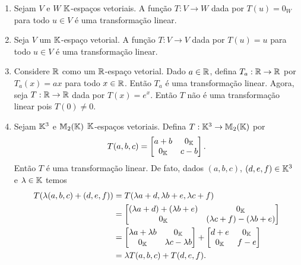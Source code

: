 \begin{exemplo}
	\begin{enumerate}
		\item Sejam $V$ e $W$ $\mathbb{K}$-espa\c{c}os vetoriais. A fun\c{c}\~ao $T : V \to W$ dada por $T(u) = 0_W$ para todo $u \in V$ \'e uma transforma\c{c}\~ao linear.
		
		\item Seja $V$ um $\mathbb{K}$-espa\c{c}o vetorial. A fun\c{c}\~ao $T : V \to V$ dada por $T(u) = u$ para todo $u \in V$ \'e uma transforma\c{c}\~ao linear.
		
		\item Considere $\mathbb{R}$ como um $\mathbb{R}$-espa\c{c}o vetorial. Dado $a \in \mathbb{R}$, defina $T_a : \mathbb{R} \to \mathbb{R}$ por $T_a(x) = ax$ para todo $x \in \mathbb{R}$. Ent\~ao $T_a$ \'e uma transforma\c{c}\~ao linear. Agora, seja $T : \mathbb{R} \to \mathbb{R}$ dada por $T(x) = e^x$. Ent\~ao $T$ n\~ao \'e uma transforma\c{c}\~ao linear pois $T(0) \ne 0$.
		
		\item Sejam $\mathbb{K}^3$ e $\mathbb{M}_2(\mathbb{K})$ $\mathbb{K}$-espa\c{c}os vetoriais. Defina $T : \mathbb{K}^3 \to \mathbb{M}_2(\mathbb{K})$ por
		\[
			T(a, b, c) = \begin{bmatrix}
				a+b & 0_{\mathbb{K}}\\
				0_{\mathbb{K}} & c - b
			\end{bmatrix}.
		\]
		Ent\~ao $T$ \'e uma transforma\c{c}\~ao linear. De fato, dados $(a, b, c)$, $(d, e, f) \in \mathbb{K}^3$ e $\lambda \in \mathbb{K}$ temos
		\begin{align*}
			T(\lambda(a,b,c) + (d,e,f)) &= T(\lambda a + d, \lambda b + e, \lambda c + f) \\ &= \begin{bmatrix}
				(\lambda a + d) + (\lambda b + e) & 0_{\mathbb{K}}\\
				0_{\mathbb{K}} & (\lambda c + f) - (\lambda b + e)
			\end{bmatrix} \\ &= \begin{bmatrix}
				\lambda a + \lambda b & 0_{\mathbb{K}}\\
				0_{\mathbb{K}} & \lambda c - \lambda b
			\end{bmatrix} + \begin{bmatrix}
				d + e & 0_{\mathbb{K}}\\
				0_{\mathbb{K}} & f - e
			\end{bmatrix} \\ &= \lambda T(a,b,c) + T(d,e,f).
		\end{align*}


\end{enumerate}
\end{exemplo}
